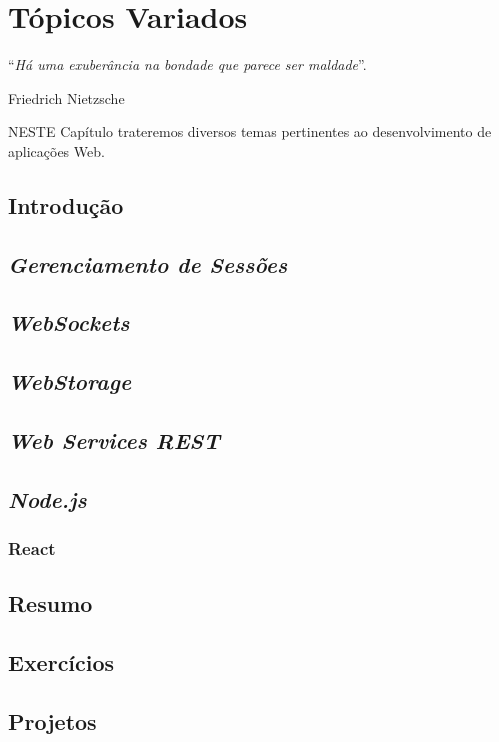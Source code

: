 \chapter{Tópicos Variados}\label{cap:topicosVariados}
\epigraph{``\textit{Há uma exuberância na bondade que parece ser maldade}''.}{Friedrich Nietzsche}

\lettrine[lines=4, lhang=0.1, lraise=0, loversize=0.2, findent=0.1em]{\textcolor{corAzulTema}{N}}{ESTE} Capítulo trateremos diversos temas pertinentes ao desenvolvimento de aplicações Web.

\section{Introdução}

\section{\textit{Gerenciamento de Sessões}}

\section{\textit{WebSockets}}

\section{\textit{WebStorage}}

\section{\textit{Web Services REST}}

\section{\textit{Node.js}}

\subsection{React}

\section{Resumo}

\section{Exercícios}

\section{Projetos}
